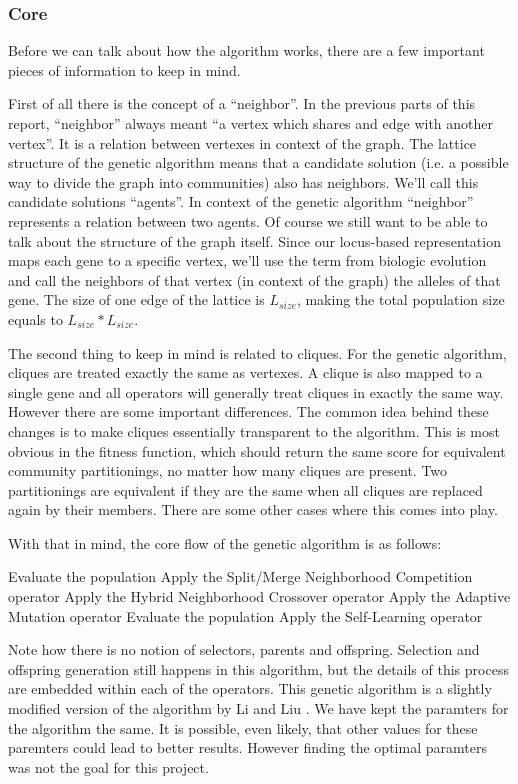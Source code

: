 \subsubsection{Core}
Before we can talk about how the algorithm works, there are a few important pieces of information to keep in mind. 
\par
First of all there is the concept of a ``neighbor''. In the previous parts of this report, ``neighbor'' always meant ``a vertex which shares and edge with another vertex''. It is a relation between vertexes in context of the graph. The lattice structure of the genetic algorithm means that a candidate solution (i.e. a possible way to divide the graph into communities) also has neighbors. We'll call this candidate solutions ``agents''. In context of the genetic algorithm ``neighbor'' represents a relation between two agents. Of course we still want to be able to talk about the structure of the graph itself. Since our locus-based representation maps each gene to a specific vertex, we'll use the term from biologic evolution and call the neighbors of that vertex (in context of the graph) the alleles of that gene. The size of one edge of the lattice is $L_{size}$, making the total population size equals to $L_{size} * L_{size}$.
\par
The second thing to keep in mind is related to cliques. For the genetic algorithm, cliques are treated exactly the same as vertexes. A clique is also mapped to a single gene and all operators will generally treat cliques in exactly the same way. However there are some important differences. The common idea behind these changes is to make cliques essentially transparent to the algorithm. This is most obvious in the fitness function, which should return the same score for equivalent community partitionings, no matter how many cliques are present. Two partitionings are equivalent if they are the same when all cliques are replaced again by their members. There are some other cases where this comes into play.
\par
With that in mind, the core flow of the genetic algorithm is as follows:
\begin{algorithmic}[1]
\STATE Evaluate the population
\STATE Apply the Split/Merge Neighborhood Competition operator
\STATE Apply the Hybrid Neighborhood Crossover operator
\STATE Apply the Adaptive Mutation operator
\STATE Evaluate the population
\STATE Apply the Self-Learning operator
\end{algorithmic}
Note how there is no notion of selectors, parents and offspring. Selection and offspring generation still happens in this algorithm, but the details of this process are embedded within each of the operators. This genetic algorithm is a slightly modified version of the algorithm by Li and Liu \cite{Li2016}. We have kept the paramters for the algorithm the same. It is possible, even likely, that other values for these paremters could lead to better results. However finding the optimal paramters was not the goal for this project.
